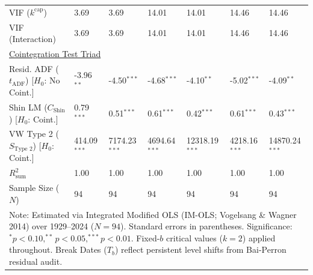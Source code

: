 \begin{table}[H]
\begin{tabular}{p{3.8cm}p{1.35cm}p{1.35cm}p{1.35cm}p{1.35cm}p{1.35cm}p{1.35cm}}
VIF ($k^{\text{cap}}$) & 3.69 & 3.69 & 14.01 & 14.01 & 14.46 & 14.46  \\
VIF (Interaction) & 3.69 & 3.69 & 14.01 & 14.01 & 14.46 & 14.46  \\
\midrule
\multicolumn{7}{l}{\underline{Cointegration Test Triad}} \\
\makecell[l]{Resid. ADF ($t_{\text{ADF}}$) \\ {\scriptsize [$H_0$: No Coint.]}} & -3.96$^{**}$ & -4.50$^{***}$ & -4.68$^{***}$ & -4.10$^{**}$ & -5.02$^{***}$ & -4.09$^{**}$  \\
\makecell[l]{Shin LM ($C_{\text{Shin}}$) \\ {\scriptsize [$H_0$: Coint.]}} & 0.79$^{***}$ & 0.51$^{***}$ & 0.61$^{***}$ & 0.42$^{***}$ & 0.61$^{***}$ & 0.43$^{***}$  \\
\makecell[l]{VW Type 2 ($S_{\text{Type 2}}$) \\ {\scriptsize [$H_0$: Coint.]}} & 414.09$^{***}$ & 7174.23$^{***}$ & 4694.64$^{***}$ & 12318.19$^{***}$ & 4218.16$^{***}$ & 14870.24$^{***}$  \\
\midrule
$R^2_{\text{sum}}$ & 1.00 & 1.00 & 1.00 & 1.00 & 1.00 & 1.00  \\
Sample Size ($N$) & 94 & 94 & 94 & 94 & 94 & 94  \\
\bottomrule
\multicolumn{7}{p{13.2cm}}{\footnotesize Note: Estimated via Integrated Modified OLS (IM-OLS; Vogelsang \& Wagner 2014) over 1929--2024 ($N=94$). Standard errors in parentheses. Significance: $^*p<0.10, ^{**}p<0.05, ^{***}p<0.01$. Fixed-$b$ critical values ($k=2$) applied throughout. Break Dates ($T_b$) reflect persistent level shifts from Bai-Perron residual audit.}
\end{tabular}
\end{table}
